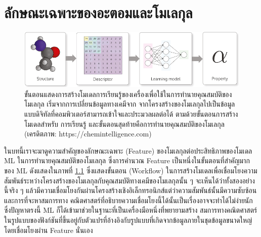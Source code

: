 

\chapter{ลักษณะเฉพาะของอะตอมและโมเลกุล}
\label{ch:feature}

\begin{figure}[htbp]
    \centering
    \includegraphics[width=\linewidth]{fig/workflow_chem_ml.png}
    \caption{ขั้นตอนแสดงการสร้างโมเดลการเรียนรู้ของเครื่องเพื่อใช้ในการทำนายคุณสมบัติของโมเลกุล เริ่มจากการเปลี่ยนข้อมูลทางเคมีจาก%
        จากโครงสร้างของโมเลกุลไปเป็นข้อมูลแบบดิจิทัลที่คอมพิวเตอร์สามารถเข้าใจและประมวลผลต่อได้ ตามด้วยขั้นตอนการสร้างโมเดลสำหรับ%
        การเรียนรู้ และขั้นตอนสุดท้ายคือการทำนายคุณสมบัติของโมเลกุล (เครดิตภาพ: https://chemintelligence.com)}
    \label{fig:workflow_chem_ml}
\end{figure}

ในบทนี้เราจะมาดูความสำคัญของลักษณะเฉพาะ (Feature) ของโมเลกุลต่อประสิทธิภาพของโมเดล ML ในการทำนายคุณสมบัติของโมเลกุล%
\autocite{yang2019a} ซึ่งการคำนวณ Feature เป็นหนึ่งในขั้นตอนที่สำคัญมากของ ML ดังแสดงในภาพที่ \ref{fig:workflow_chem_ml}
ซึ่งแสดงขั้นตอน (Workflow) ในการสร้างโมเดลเพื่อเชื่อมโยงความสัมพันธ์ระหว่างโครงสร้างของโมเลกุลกับคุณสมบัติทางเคมีของโมเลกุลนั้น ๆ
จะเห็นได้ว่าทั้งสองอย่างนี้จริง ๆ แล้วมีความเชื่อมโยงกันผ่านโครงสร้างเชิงอิเล็กทรอนิกส์แต่ว่าความสัมพันธ์นั้นมีความซับซ้อนและการที่จะหาสมการทาง%
คณิตศาสตร์ที่อธิบายความเชื่อมโยงนี้ได้นั้นเป็นเรื่องอาจจะทำได้ไม่ง่ายนัก ซึ่งปัญหาตรงนี้ ML ก็ได้เข้ามาช่วยในฐานะที่เป็นเครื่องมือหนึ่งที่พยายามสร้าง%
สมการทางคณิตศาสตร์ในรูปแบบของฟังก์ชันที่ขึ้นอยู่กับตัวแปรที่อ้างอิงกับรูปแบบที่เกิดจากข้อมูลภายในชุดข้อมูลขนาดใหญ่โดยเชื่อมโยงผ่าน Feature
นั่นเอง

